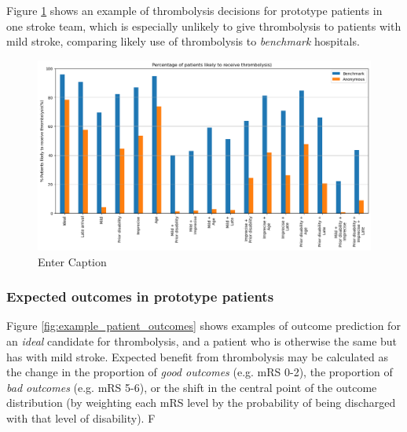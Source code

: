 Figure \ref{fig:thrombolysis_rates_prototype_patients_team_x} shows an example of thrombolysis decisions for prototype patients in one stroke team, which is especially unlikely to give thrombolysis to patients with mild stroke, comparing likely use of thrombolysis to \textit{benchmark} hospitals.

\begin{figure}
    \centering
    \includegraphics[width=1\linewidth]{images/prototype_patients_team_x.png}
    \caption{Enter Caption}
    \label{fig:thrombolysis_rates_prototype_patients_team_x}
\end{figure}


\subsubsection{Expected outcomes in prototype patients}

Figure \ref{fig:example_patient_outcomes} shows examples of outcome prediction for an \textit{ideal} candidate for thrombolysis, and a patient who is otherwise the same but has with mild stroke. Expected benefit from thrombolysis may be calculated as the change in the proportion of \textit{good outcomes} (e.g. mRS 0-2), the proportion of \textit{bad outcomes} (e.g. mRS 5-6), or the shift in the central point of the outcome distribution (by weighting each mRS level by the probability of being discharged with that level of disability). F


